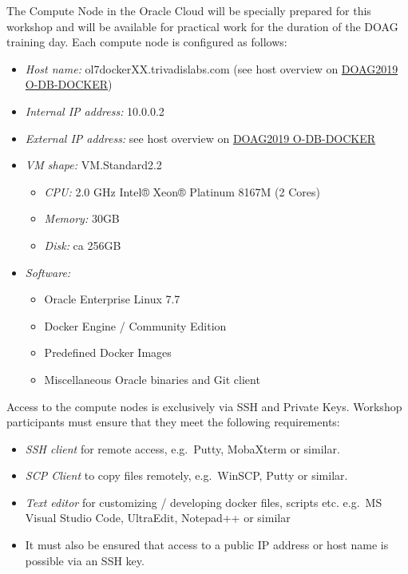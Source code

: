 The Compute Node in the Oracle Cloud will be specially prepared for this
workshop and will be available for practical work for the duration of
the DOAG training day. Each compute node is configured as follows:

\begin{itemize}
\tightlist
\item
  \emph{Host name:} ol7dockerXX.trivadislabs.com (see host overview on
  \href{https://url.oradba.ch/DOAG2019_O-DB-DOCKER}{DOAG2019
  O-DB-DOCKER})
\item
  \emph{Internal IP address:} 10.0.0.2
\item
  \emph{External IP address:} see host overview on
  \href{https://url.oradba.ch/DOAG2019_O-DB-DOCKER}{DOAG2019
  O-DB-DOCKER}
\item
  \emph{VM shape:} VM.Standard2.2

  \begin{itemize}
  \tightlist
  \item
    \emph{CPU:} 2.0 GHz Intel® Xeon® Platinum 8167M (2 Cores)
  \item
    \emph{Memory:} 30GB
  \item
    \emph{Disk:} ca 256GB
  \end{itemize}
\item
  \emph{Software:}

  \begin{itemize}
  \tightlist
  \item
    Oracle Enterprise Linux 7.7
  \item
    Docker Engine / Community Edition
  \item
    Predefined Docker Images
  \item
    Miscellaneous Oracle binaries and Git client
  \end{itemize}
\end{itemize}

Access to the compute nodes is exclusively via SSH and Private Keys.
Workshop participants must ensure that they meet the following
requirements:

\begin{itemize}
\tightlist
\item
  \emph{SSH client} for remote access, e.g.~Putty, MobaXterm or similar.
\item
  \emph{SCP Client} to copy files remotely, e.g.~WinSCP, Putty or
  similar.
\item
  \emph{Text editor} for customizing / developing docker files, scripts
  etc. e.g.~MS Visual Studio Code, UltraEdit, Notepad++ or similar
\item
  It must also be ensured that access to a public IP address or host
  name is possible via an SSH key.
\end{itemize}

